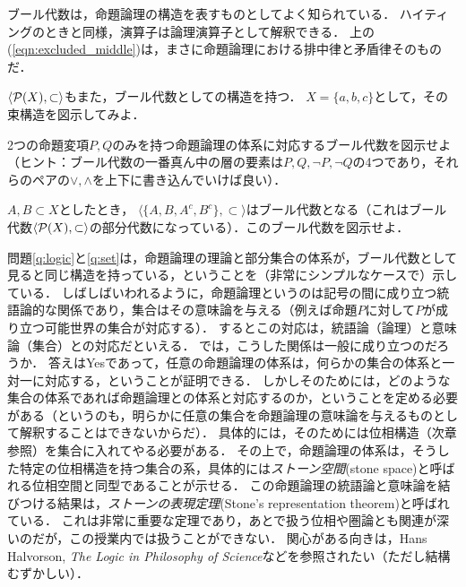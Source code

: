 \documentclass[11pt,a4paper]{jsarticle}
\begin{document}
ブール代数は，命題論理の構造を表すものとしてよく知られている．
ハイティングのときと同様，演算子は論理演算子として解釈できる．
上の(\ref{eqn:excluded_middle})は，まさに命題論理における排中律と矛盾律そのものだ．


\begin{exercise}
 $\langle \mathcal{P}(X), \subset \rangle$もまた，ブール代数としての構造を持つ．
 $X = \{a,b,c\}$として，その束構造を図示してみよ．
\end{exercise}


\begin{exercise}
\label{q:logic}
2つの命題変項$P, Q$のみを持つ命題論理の体系に対応するブール代数を図示せよ（ヒント：ブール代数の一番真ん中の層の要素は$P, Q, \neg P, \neg Q$の4つであり，それらのペアの$\vee, \wedge$を上下に書き込んでいけば良い）．
\end{exercise}

\begin{exercise}
\label{q:set}
$A, B \subset X$としたとき， $\langle \{ A, B, A^c, B^c \}, \subset \rangle$はブール代数となる（これはブール代数$\langle \mathcal{P}(X), \subset \rangle$の部分代数になっている）．このブール代数を図示せよ．
\end{exercise}

\begin{develop}
問題\ref{q:logic}と\ref{q:set}は，命題論理の理論と部分集合の体系が，ブール代数として見ると同じ構造を持っている，ということを（非常にシンプルなケースで）示している．
しばしばいわれるように，命題論理というのは記号の間に成り立つ統語論的な関係であり，集合はその意味論を与える（例えば命題$P$に対して$P$が成り立つ可能世界の集合が対応する）．
するとこの対応は，統語論（論理）と意味論（集合）との対応だといえる．
では，こうした関係は一般に成り立つのだろうか．
答えはYesであって，任意の命題論理の体系は，何らかの集合の体系と一対一に対応する，ということが証明できる．
しかしそのためには，どのような集合の体系であれば命題論理との体系と対応するのか，ということを定める必要がある（というのも，明らかに任意の集合を命題論理の意味論を与えるものとして解釈することはできないからだ）．
具体的には，そのためには位相構造（次章参照）を集合に入れてやる必要がある．
その上で，命題論理の体系は，そうした特定の位相構造を持つ集合の系，具体的には\emph{ストーン空間}(stone space)と呼ばれる位相空間と同型であることが示せる．
この命題論理の統語論と意味論を結びつける結果は，\emph{ストーンの表現定理}(Stone's representation theorem)と呼ばれている．
これは非常に重要な定理であり，あとで扱う位相や圏論とも関連が深いのだが，この授業内では扱うことができない．
関心がある向きは，Hans Halvorson, \textit{The Logic in Philosophy of Science}などを参照されたい（ただし結構むずかしい）．
\end{develop}
\end{document}
